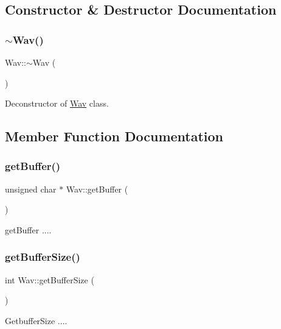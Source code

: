\subsection{Constructor \& Destructor Documentation}
\mbox{\label{classWav_a1510b246ba121b103a60b8e7839af25f}} 
\subsubsection{\texorpdfstring{$\sim$\+Wav()}{~Wav()}}
{\footnotesize\ttfamily Wav\+::$\sim$\+Wav (\begin{DoxyParamCaption}{ }\end{DoxyParamCaption})}

Deconstructor of \hyperlink{classWav}{Wav} class. 

\subsection{Member Function Documentation}
\mbox{\label{classWav_a2daf07a90ed34789e3a1874973d9bd36}} 
\subsubsection{\texorpdfstring{get\+Buffer()}{getBuffer()}}
{\footnotesize\ttfamily unsigned char $\ast$ Wav\+::get\+Buffer (\begin{DoxyParamCaption}{ }\end{DoxyParamCaption})}

get\+Buffer .... \mbox{\label{classWav_a11de10cb698ea0ea08f3a28580f21b39}} 
\subsubsection{\texorpdfstring{get\+Buffer\+Size()}{getBufferSize()}}
{\footnotesize\ttfamily int Wav\+::get\+Buffer\+Size (\begin{DoxyParamCaption}{ }\end{DoxyParamCaption})}

Getbuffer\+Size .... \mbox{\label{classWav_a5e521ff6da3e7a3ed546d948a125847f}} 
